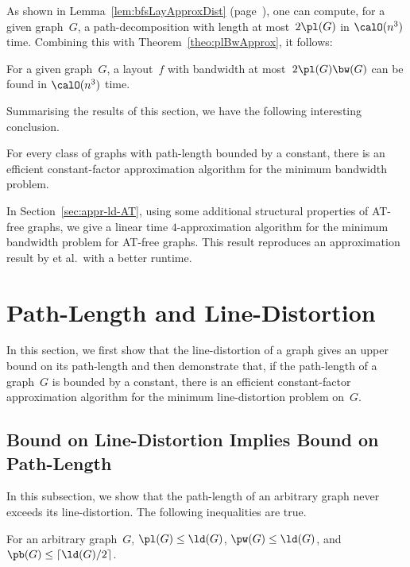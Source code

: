 As shown in Lemma~\ref{lem:bfsLayApproxDist} (page~\pageref{lem:bfsLayApproxDist}), one can compute, for a given graph~$G$, a path-decomposition with length at most~$2 \pl(G)$ in $\calO(n^3)$ time.
Combining this with Theorem~\ref{theo:plBwApprox}, it follows:

\begin{corollary}
For a given graph~\( G \), a layout~\( f \) with bandwidth at most~\( 2 \pl(G) \bw(G) \) can be found in \( \calO(n^3) \) time.
\end{corollary}

Summarising the results of this section, we have the following interesting conclusion.

\begin{theorem}
    \label{theo:plClassBwApprox}
For every class of graphs with path-length bounded by a constant, there is an efficient constant-factor approximation algorithm for the minimum bandwidth problem.
\end{theorem}

In Section~\ref{sec:appr-ld-AT}, using some additional structural properties of AT-free graphs, we give a linear time $4$-approximation algorithm for the minimum bandwidth problem for AT-free graphs.
This result reproduces an approximation result by  et al.\,\cite{KlokKratMuel1999} with a better runtime.


\section{Path-Length and Line-Distortion}
    \label{sec:ld-vs-pl}

In this section, we first show that the line-distortion of a graph gives an upper bound on its path-length and then demonstrate that, if the path-length of a graph~$G$ is bounded by a constant, there is an efficient constant-factor approximation algorithm for the minimum line-distortion problem on~$G$.


\subsection{Bound on Line-Distortion Implies Bound on Path-Length}
    \label{sec:ld-bounds-pl}

In this subsection, we show that the path-length of an arbitrary graph never exceeds its line-distortion.
The following inequalities are true.

\begin{theorem}
    \label{theo:ldPlRelation}
For an arbitrary graph~\( G \), \( \pl(G) \leq \ld(G) \), \( \pw(G) \leq \ld(G) \), and \( \pb(G) \leq \lceil \ld(G) / 2 \rceil \).
\end{theorem}

